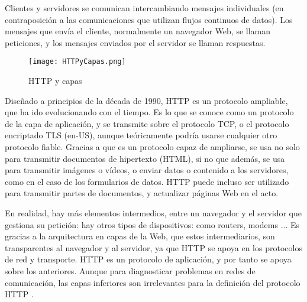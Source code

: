 Clientes y servidores se comunican intercambiando mensajes individuales (en contraposición a las comunicaciones que utilizan flujos continuos de datos). Los mensajes que envía el cliente, normalmente un navegador Web, se llaman peticiones, y los mensajes enviados por el servidor se llaman respuestas.

\begin{figure}[H]
	\center
	\texttt{[image: HTTPyCapas.png]}
	\caption{HTTP y capas}
	\label{fig:super}
\end{figure}

Diseñado a principios de la década de 1990, HTTP es un protocolo ampliable, que ha ido evolucionando con el tiempo. Es lo que se conoce como un protocolo de la capa de aplicación, y se transmite sobre el protocolo TCP, o el protocolo encriptado TLS (en-US), aunque teóricamente podría usarse cualquier otro protocolo fiable. Gracias a que es un protocolo capaz de ampliarse, se usa no solo para transmitir documentos de hipertexto (HTML), si no que además, se usa para transmitir imágenes o vídeos, o enviar datos o contenido a los servidores, como en el caso de los formularios de datos. HTTP puede incluso ser utilizado para transmitir partes de documentos, y actualizar páginas Web en el acto.

En realidad, hay más elementos intermedios, entre un navegador y el servidor que gestiona su petición: hay otros tipos de dispositivos: como routers, modems ... Es gracias a la arquitectura en capas de la Web, que estos intermediarios, son transparentes al navegador y al servidor, ya que HTTP se apoya en los protocolos de red y transporte. HTTP es un protocolo de aplicación, y por tanto se apoya sobre los anteriores. Aunque para diagnosticar problemas en redes de comunicación, las capas inferiores son irrelevantes para la definición del protocolo HTTP . 


